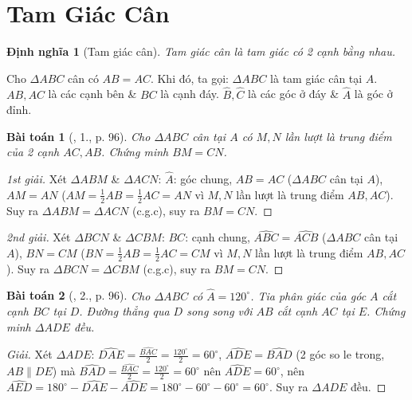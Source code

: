 \documentclass{article}
\newtheorem{baitoan}{Bài toán}
\newtheorem{dinhnghia}{Định nghĩa}
\begin{document}

\section{Tam Giác Cân}

\begin{dinhnghia}[Tam giác cân]
	\emph{Tam giác cân} là tam giác có 2 cạnh bằng nhau.
\end{dinhnghia}
Cho $\Delta ABC$ cân có $AB = AC$. Khi đó, ta gọi: $\Delta ABC$ là tam giác cân tại $A$. $AB,AC$ là các cạnh bên \& $BC$ là cạnh đáy. $\widehat{B},\widehat{C}$ là các góc ở đáy \& $\widehat{A}$ là góc ở đỉnh.

\begin{baitoan}[\cite{SGK_Toan_7_Canh_Dieu_tap_2}, 1., p. 96]
	Cho $\Delta ABC$ cân tại $A$ có $M,N$ lần lượt là trung điểm của 2 cạnh $AC,AB$. Chứng minh $BM = CN$.
\end{baitoan}

\begin{proof}[1st giải]
	Xét $\Delta ABM$ \& $\Delta ACN$: $\widehat{A}$: góc chung, $AB = AC$ ($\Delta ABC$ cân tại $A$), $AM = AN$ ($AM = \frac{1}{2}AB = \frac{1}{2}AC = AN$ vì $M,N$ lần lượt là trung điểm $AB,AC$). Suy ra $\Delta ABM = \Delta ACN$ (c.g.c), suy ra $BM = CN$.
\end{proof}

\begin{proof}[2nd giải]
	Xét $\Delta BCN$ \& $\Delta CBM$: $BC$: cạnh chung, $\widehat{ABC} = \widehat{ACB}$ ($\Delta ABC$ cân tại $A$), $BN = CM$ ($BN = \frac{1}{2}AB = \frac{1}{2}AC = CM$ vì $M,N$ lần lượt là trung điểm $AB,AC$). Suy ra $\Delta BCN = \Delta CBM$ (c.g.c), suy ra $BM = CN$.
\end{proof}

\begin{baitoan}[\cite{SGK_Toan_7_Canh_Dieu_tap_2}, 2., p. 96]
	Cho $\Delta ABC$ có $\widehat{A} = 120^\circ$. Tia phân giác của góc $A$ cắt cạnh $BC$ tại $D$. Đường thẳng qua $D$ song song với $AB$ cắt cạnh $AC$ tại $E$. Chứng minh $\Delta ADE$ đều.
\end{baitoan}

\begin{proof}[Giải]
	Xét $\Delta ADE$: $\widehat{DAE} = \frac{\widehat{BAC}}{2} = \frac{120^\circ}{2} = 60^\circ$, $\widehat{ADE} = \widehat{BAD}$ (2 góc so le trong, $AB\parallel DE$) mà $\widehat{BAD} = \frac{\widehat{BAC}}{2} = \frac{120^\circ}{2} = 60^\circ$ nên $\widehat{ADE} = 60^\circ$, nên $\widehat{AED} = 180^\circ - \widehat{DAE} - \widehat{ADE} = 180^\circ - 60^\circ - 60^\circ = 60^\circ$. Suy ra $\Delta ADE$ đều.
\end{proof}
\end{document}
